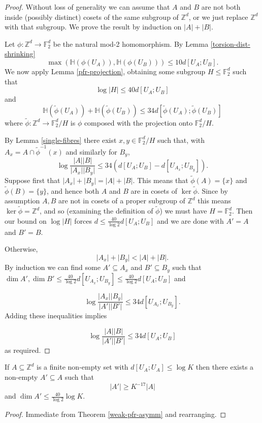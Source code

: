 \begin{proof}
\leanok
Without loss of generality we can assume that $A$ and $B$ are not both inside (possibly distinct) cosets of the same subgroup of $\mathbb{Z}^d$, or we just replace $\mathbb{Z}^d$ with that subgroup. We prove the result by induction on $\lvert A\rvert+\lvert B\rvert$.

Let $\phi:\mathbb{Z}^d\to \mathbb{F}_2^d$ be the natural mod-2 homomorphism. By Lemma \ref{torsion-dist-shrinking}
\[\max(\mathbb{H}(\phi(U_A)),\mathbb{H}(\phi(U_B)))\leq 10d[U_A;U_B].\]
We now apply Lemma \ref{pfr-projection}, obtaining some subgroup $H\leq \mathbb{F}_2^d$ such that
\[\log \lvert H\rvert \leq 40d[U_A;U_B]\]
and
\[\mathbb{H}(\tilde{\phi}(U_A))+\mathbb{H}(\tilde{\phi}(U_B))\leq 34 d[\tilde{\phi}(U_A);\tilde{\phi}(U_B)]\]
where $\tilde{\phi}:\mathbb{Z}^d\to \mathbb{F}_2^d/H$ is $\phi$ composed with the projection onto $\mathbb{F}_2^d/H$.


By Lemma \ref{single-fibres} there exist $x,y\in \mathbb{F}_2^d/H$ such that, with $A_x=A\cap \tilde{\phi}^{-1}(x)$ and similarly for $B_y$,
\[\log \frac{\lvert A\rvert\lvert B\rvert}{\lvert A_x\rvert\lvert B_y\rvert}\leq 34(d[U_A;U_B]-d[U_{A_x};U_{B_y}]).\]
Suppose first that $\lvert A_x\rvert+\lvert B_y\rvert=\lvert A\rvert+\lvert B\rvert$. This means that $\tilde{\phi}(A)=\{x\}$ and $\tilde{\phi}(B)=\{y\}$, and hence both $A$ and $B$ are in cosets of $\ker \tilde{\phi}$. Since by assumption $A,B$ are not in cosets of a proper subgroup of $\mathbb{Z}^d$ this means $\ker\tilde{\phi}=\mathbb{Z}^d$, and so (examining the definition of $\tilde{\phi}$) we must have $H=\mathbb{F}_2^d$. Then our bound on $\log\lvert H\rvert$ forces $d\leq \frac{40}{\log 2}d[U_A;U_B]$ and we are done with $A'=A$ and $B'=B$.

Otherwise,
\[\lvert A_x\rvert+\lvert B_y\rvert <\lvert A\rvert+\lvert B\rvert.\]
By induction we can find some $A'\subseteq A_x$ and $B'\subseteq B_y$ such that $\dim A',\dim B'\leq \frac{40}{\log 2} d[U_{A_x};U_{B_y}]\leq \frac{40}{\log 2}d[U_A;U_B]$ and

\[\log \frac{\lvert A_x\rvert\lvert B_y\rvert}{\lvert A'\rvert\lvert B'\rvert}\leq 34d[U_{A_x};U_{B_y}].\]
Adding these inequalities implies

\[\log\frac{\lvert A\rvert\lvert B\rvert}{\lvert A'\rvert\lvert B'\rvert}\leq 34d[U_A;U_B]\]
as required.
\end{proof}

\begin{theorem}\label{weak-pfr-symm}\leanok
If $A\subseteq \mathbb{Z}^d$ is a finite non-empty set with $d[U_A;U_A]\leq \log K$ then there exists a non-empty $A'\subseteq A$ such that
\[\lvert A'\rvert\geq K^{-17}\lvert A\rvert\]
and $\dim A'\leq \frac{40}{\log 2} \log K$.
\end{theorem}
\begin{proof}
\leanok
Immediate from Theorem \ref{weak-pfr-asymm} and rearranging.
\end{proof}

